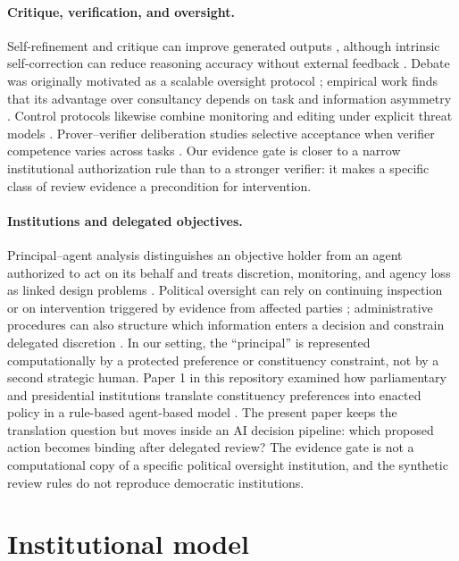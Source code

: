\documentclass[10pt]{article}
\begin{document}
\paragraph{Critique, verification, and oversight.}
Self-refinement and critique can improve generated outputs
\cite{madaan2023selfrefine,saunders2022selfcritiquing}, although intrinsic
self-correction can reduce reasoning accuracy without external feedback
\cite{huang2023cannot}. Debate was originally motivated as a scalable oversight
protocol \cite{irving2018debate}; empirical work finds that its advantage over
consultancy depends on task and information asymmetry \cite{kenton2024oversight}.
Control protocols likewise combine monitoring and editing under explicit threat
models \cite{greenblatt2023control}. Prover--verifier deliberation studies
selective acceptance when verifier competence varies across tasks
\cite{sedoc2026trust}. Our evidence gate is closer to a narrow institutional
authorization rule than to a stronger verifier: it makes a specific class of
review evidence a precondition for intervention.

\paragraph{Institutions and delegated objectives.}
Principal--agent analysis distinguishes an objective holder from an agent
authorized to act on its behalf and treats discretion, monitoring, and agency
loss as linked design problems \cite{moe1984economics,huber2002discretion}.
Political oversight can
rely on continuing inspection or on intervention triggered by evidence from
affected parties \cite{mccubbins1984oversight}; administrative procedures can
also structure which information enters a decision and constrain delegated
discretion \cite{mccubbins1987procedures}. In our setting, the ``principal'' is
represented computationally by a protected preference or constituency
constraint, not by a second strategic human. Paper 1 in this repository
examined how parliamentary and presidential institutions translate
constituency preferences into enacted policy in a rule-based agent-based model
\cite{ali2026fragmented}. The present paper keeps the translation question but
moves inside an AI decision pipeline: which proposed action becomes binding
after delegated review? The evidence gate is not a computational copy of a
specific political oversight institution, and the synthetic review rules do
not reproduce democratic institutions.

\section{Institutional model}
\end{document}

